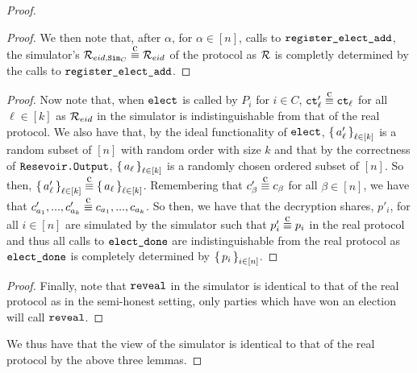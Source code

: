 \begin{theorem}
\begin{proof}
\begin{lemma}
\begin{proof}
				We then note that, after $\alpha$, for $\alpha \in [n]$,  calls to $\texttt{register\_elect\_add}$, the simulator's $\resSampling_{\eid, \simCMSLE} \compInd \resSampling_\eid$
				of the protocol as $\mathcal{R}$ is completly determined by the calls to $\texttt{register\_elect\_add}$.
			\end{proof}
		\end{lemma}
		\begin{lemma}
			\begin{proof}
				Now note that, when $\texttt{elect}$ is called by $P_i$ for $i \in C$, $\ct'_\ell \compInd \ct_\ell$ for all $\ell \in [k]$
				as $\mathcal{R}_{eid}$ in the simulator is indistinguishable from that of the real protocol.
				We also have that, by the ideal functionality of $\texttt{elect}$, $\set{a'_\ell}_{\ell \in [k]}$ is a random subset of $[n]$ with random order with size $k$
				and that by the correctness of $\texttt{Resevoir.Output}$, $\set{a_\ell}_{\ell \in [k]}$ is a randomly chosen ordered subset of $[n]$.
				So then, $\set{a'_\ell}_{\ell \in [k]} \compInd \set{a_\ell}_{\ell \in [k]}$.
				Remembering that $c'_\beta \compInd c_\beta$ for all $\beta \in [n]$, we have that $c'_{a_1}, ..., c'_{a_k} \compInd c_{a_1}, ..., c_{a_k}$.
				So then, we have that the decryption shares, $p'_i$, for all $i \in [n]$ are simulated by the simulator such that $p'_i \compInd p_i$ in the real protocol
				and thus all calls to $\texttt{elect\_done}$ are indistinguishable from the real protocol as $\texttt{elect\_done}$ is completely
				determined by $\set{p_i}_{i \in [n]}$.

			\end{proof}
		\end{lemma}
		\begin{lemma}
			\begin{proof}
			Finally, note that $\texttt{reveal}$ in the simulator is identical to that of the real protocol
			as in the semi-honest setting, only parties which have won an election will call $\texttt{reveal}$.
			\end{proof}
		\end{lemma}
		We thus have that the view of the simulator is identical to that of the real protocol by the above three lemmas.
	\end{proof}
\end{theorem}


